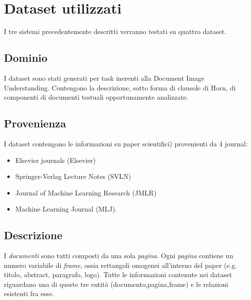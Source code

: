 \section{Dataset utilizzati}


I tre sistemi precedentemente descritti verranno testati su quattro dataset.

\subsection{Dominio}
I dataset sono stati generati per task inerenti alla Document Image Understanding.
Contengono la descrizione, sotto forma di clausole di Horn, di componenti di documenti testuali opportunamente analizzate.

\subsection{Provenienza}
I dataset contengono le informazioni su paper scientifici) provenienti da 4 journal:
\begin{itemize}
\item Elsevier journals (Elsevier)
\item Springer-Verlag Lecture Notes (SVLN)
\item Journal of Machine Learning Research (JMLR)
\item Machine Learning Journal (MLJ).
\end{itemize}


\subsection{Descrizione}
I \emph{documenti} sono tutti composti da una sola \emph{pagina}. Ogni \emph{pagina} contiene un numero variabile di \emph{frame}, ossia rettangoli omogenei all'interno del paper (e.g. titolo, abstract, paragrafo, logo).
Tutte le informazioni contenute nei dataset riguardano una di queste tre entità (documento,pagina,frame) e le relazioni esistenti fra esse.

